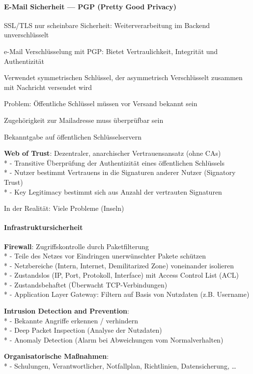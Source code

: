 \paragraph{E-Mail Sicherheit --- PGP (Pretty Good Privacy)}
\begin{items}
	\item SSL/TLS nur scheinbare Sicherheit: Weiterverarbeitung im Backend unverschlüsselt
	\item e-Mail Verschlüsselung mit PGP: Bietet Vertraulichkeit, Integrität und Authentizität
	\item Verwendet symmetrischen Schlüssel, der asymmetrisch Verschlüsselt zusammen mit Nachricht versendet wird
	
	\medskip
	\item Problem: Öffentliche Schlüssel müssen vor Versand bekannt sein
	\item Zugehörigkeit zur Mailadresse muss überprüfbar sein
	\item Bekanntgabe auf öffentlichen Schlüsselservern
	\item \textbf{Web of Trust}: Dezentraler, anarchischer Vertrauensansatz (ohne CAs)\\*
		- Transitive Überprüfung der Authentizität eines öffentlichen Schlüssels\\*
		- Nutzer bestimmt Vertrauens in die Signaturen anderer Nutzer (Signatory Trust)\\*
		- Key Legitimacy bestimmt sich aus Anzahl der vertrauten Signaturen
	\item In der Realität: Viele Probleme (Inseln)
\end{items}

\paragraph{Infrastruktursicherheit}
\begin{items}
	\item \textbf{Firewall}: Zugriffskontrolle durch Paketfilterung\\*
		- Teile des Netzes vor Eindringen unerwünschter Pakete schützen\\*
		- Netzbereiche (Intern, Internet, Demilitarized Zone) voneinander isolieren\\*
		- Zustandslos (IP, Port, Protokoll, Interface) mit Access Control List (ACL)\\*
		- Zustandsbehaftet (Überwacht TCP-Verbindungen)\\*
		- Application Layer Gateway: Filtern auf Basis von Nutzdaten (z.B. Username)
	\item \textbf{Intrusion Detection and Prevention}: \\*
		- Bekannte Angriffe erkennen / verhindern\\*
		- Deep Packet Inspection (Analyse der Nutzdaten)\\*
		- Anomaly Detection (Alarm bei Abweichungen vom Normalverhalten)
	\item \textbf{Organisatorische Maßnahmen}:\\*
		- Schulungen, Verantwortlicher, Notfallplan, Richtlinien, Datensicherung, \dots
\end{items}


